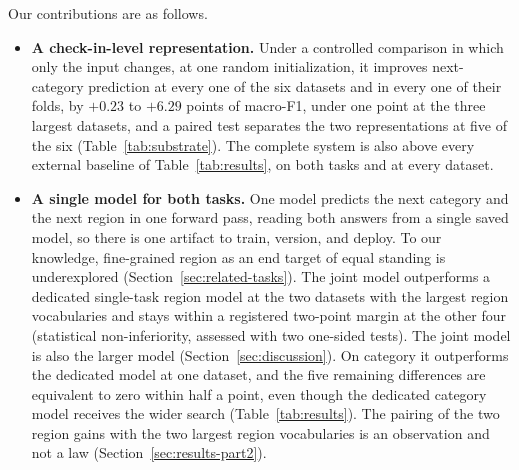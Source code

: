 Our contributions are as follows.
\begin{itemize}
  \item \textbf{A check-in-level representation.} Under a controlled comparison in which only the input
    changes, at one random initialization, it improves next-category prediction at every one of
    the six datasets and in every one of their folds, by $+0.23$ to $+6.29$ points of macro-F1,
    under one point at the three largest datasets, and a paired test separates the two
    representations at five of the six (Table~\ref{tab:substrate}). The complete system is also above every external baseline of Table~\ref{tab:results},
    on both tasks and at every dataset.
  \item \textbf{A single model for both tasks.} One model predicts the next category and the next
    region in one forward pass, reading both answers from a single saved model, so there is one
    artifact to train, version, and deploy. To our knowledge, fine-grained region as an end target
    of equal standing is underexplored (Section~\ref{sec:related-tasks}). The joint model outperforms a dedicated single-task region model at the
    two datasets with the largest region vocabularies and stays within a registered two-point
    margin at the other four (statistical non-inferiority, assessed with two one-sided tests). The joint model is also the larger model (Section~\ref{sec:discussion}). On category it outperforms the dedicated model
    at one dataset, and the five remaining differences are equivalent to zero within half a point,
    even though the
    dedicated category model receives the wider search
    (Table~\ref{tab:results}). The pairing of the two region gains with the two largest region vocabularies is an
    observation and not a law (Section~\ref{sec:results-part2}).
\end{itemize}

